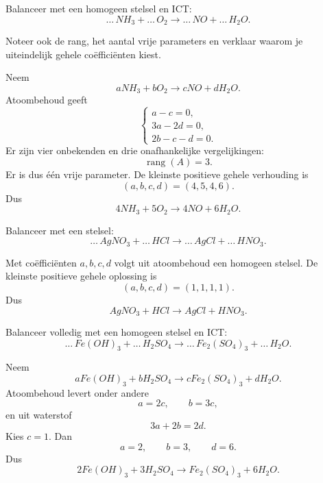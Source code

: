 \documentclass{ximera}
\begin{document}
\begin{oefening}{\oefB\ESS}

Balanceer met een homogeen stelsel en ICT:
\[
\ldots\,NH_3+\ldots\,O_2
\longrightarrow
\ldots\,NO+\ldots\,H_2O.
\]

Noteer ook de rang, het aantal vrije parameters en verklaar waarom je
uiteindelijk gehele coëfficiënten kiest.

\begin{oplossing}
Neem
\[
aNH_3+bO_2\longrightarrow cNO+dH_2O.
\]
Atoombehoud geeft
\[
\begin{cases}
a-c=0,\\
3a-2d=0,\\
2b-c-d=0.
\end{cases}
\]
Er zijn vier onbekenden en drie onafhankelijke vergelijkingen:
\[
\operatorname{rang}(A)=3.
\]
Er is dus één vrije parameter. De kleinste positieve gehele verhouding is
\[
(a,b,c,d)=(4,5,4,6).
\]
Dus
\[
\boxed{4NH_3+5O_2\longrightarrow4NO+6H_2O}.
\]
\end{oplossing}
\end{oefening}


\begin{oefening}[Neerslagreactie]{\oefB\ESS}

Balanceer met een stelsel:
\[
\ldots\,AgNO_3+\ldots\,HCl
\longrightarrow
\ldots\,AgCl+\ldots\,HNO_3.
\]

\begin{oplossing}
Met coëfficiënten \(a,b,c,d\) volgt uit atoombehoud een homogeen stelsel.
De kleinste positieve gehele oplossing is
\[
(a,b,c,d)=(1,1,1,1).
\]
Dus
\[
\boxed{AgNO_3+HCl\longrightarrow AgCl+HNO_3}.
\]
\end{oplossing}
\end{oefening}


\begin{oefening}{\oefU\ESS}

Balanceer volledig met een homogeen stelsel en ICT:
\[
\ldots\,Fe(OH)_3+\ldots\,H_2SO_4
\longrightarrow
\ldots\,Fe_2(SO_4)_3+\ldots\,H_2O.
\]

\begin{oplossing}
Neem
\[
aFe(OH)_3+bH_2SO_4\longrightarrow cFe_2(SO_4)_3+dH_2O.
\]
Atoombehoud levert onder andere
\[
a=2c,\qquad b=3c,
\]
en uit waterstof
\[
3a+2b=2d.
\]
Kies \(c=1\). Dan
\[
a=2,\qquad b=3,\qquad d=6.
\]
Dus
\[
\boxed{2Fe(OH)_3+3H_2SO_4\longrightarrow Fe_2(SO_4)_3+6H_2O}.
\]
\end{oplossing}
\end{oefening}
\end{document}
